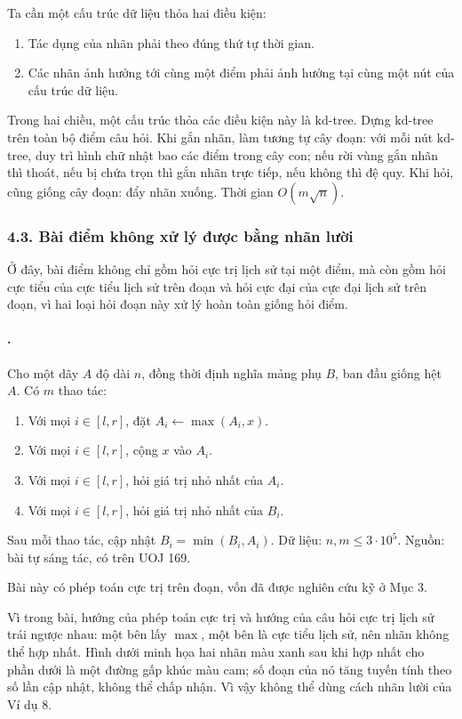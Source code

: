 \documentclass[11pt]{article}
\begin{document}
Ta cần một cấu trúc dữ liệu thỏa hai điều kiện:
\begin{enumerate}
  \item Tác dụng của nhãn phải theo đúng thứ tự thời gian.
  \item Các nhãn ảnh hưởng tới cùng một điểm phải ảnh hưởng tại cùng một nút
  của cấu trúc dữ liệu.
\end{enumerate}
Trong hai chiều, một cấu trúc thỏa các điều kiện này là \(\mathrm{kd}\)-tree.
Dựng \(\mathrm{kd}\)-tree trên toàn bộ điểm câu hỏi. Khi gắn nhãn, làm tương
tự cây đoạn: với mỗi nút \(\mathrm{kd}\)-tree, duy trì hình chữ nhật bao các
điểm trong cây con; nếu rời vùng gắn nhãn thì thoát, nếu bị chứa trọn thì
gắn nhãn trực tiếp, nếu không thì đệ quy. Khi hỏi, cũng giống cây đoạn: đẩy
nhãn xuống. Thời gian \(O(m\sqrt n)\).

\subsubsection*{4.3. Bài điểm không xử lý được bằng nhãn lười}

Ở đây, bài điểm không chỉ gồm hỏi cực trị lịch sử tại một điểm, mà còn gồm
hỏi cực tiểu của cực tiểu lịch sử trên đoạn và hỏi cực đại của cực đại lịch
sử trên đoạn, vì hai loại hỏi đoạn này xử lý hoàn toàn giống hỏi điểm.

\paragraph{.}
Cho một dãy \(A\) độ dài \(n\), đồng thời định nghĩa mảng phụ \(B\), ban đầu
giống hệt \(A\). Có \(m\) thao tác:
\begin{enumerate}
  \item Với mọi \(i\in[l,r]\), đặt \(A_i\leftarrow \max(A_i,x)\).
  \item Với mọi \(i\in[l,r]\), cộng \(x\) vào \(A_i\).
  \item Với mọi \(i\in[l,r]\), hỏi giá trị nhỏ nhất của \(A_i\).
  \item Với mọi \(i\in[l,r]\), hỏi giá trị nhỏ nhất của \(B_i\).
\end{enumerate}
Sau mỗi thao tác, cập nhật \(B_i=\min(B_i,A_i)\). Dữ liệu:
\(n,m\le 3\cdot 10^5\). Nguồn: bài tự sáng tác, có trên UOJ 169.

Bài này có phép toán cực trị trên đoạn, vốn đã được nghiên cứu kỹ ở Mục 3.

Vì trong bài, hướng của phép toán cực trị và hướng của câu hỏi cực trị lịch sử
trái ngược nhau: một bên lấy \(\max\), một bên là cực tiểu lịch sử, nên nhãn
không thể hợp nhất. Hình dưới minh họa hai nhãn màu xanh sau khi hợp nhất cho
phần dưới là một đường gấp khúc màu cam; số đoạn của nó tăng tuyến tính theo số
lần cập nhật, không thể chấp nhận. Vì vậy không thể dùng cách nhãn lười của Ví
dụ 8.
\end{document}

